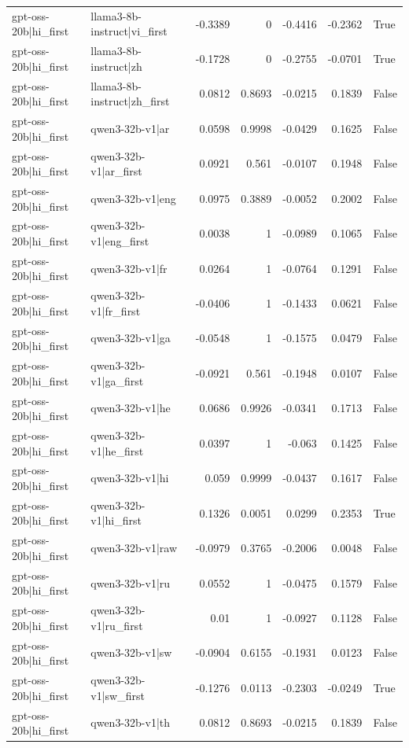 \begin{table}
\begin{tabular}{l l r r r r l}
gpt-oss-20b|hi_first & llama3-8b-instruct|vi_first & -0.3389 & 0 & -0.4416 & -0.2362 & True \\
gpt-oss-20b|hi_first & llama3-8b-instruct|zh & -0.1728 & 0 & -0.2755 & -0.0701 & True \\
gpt-oss-20b|hi_first & llama3-8b-instruct|zh_first & 0.0812 & 0.8693 & -0.0215 & 0.1839 & False \\
gpt-oss-20b|hi_first & qwen3-32b-v1|ar & 0.0598 & 0.9998 & -0.0429 & 0.1625 & False \\
gpt-oss-20b|hi_first & qwen3-32b-v1|ar_first & 0.0921 & 0.561 & -0.0107 & 0.1948 & False \\
gpt-oss-20b|hi_first & qwen3-32b-v1|eng & 0.0975 & 0.3889 & -0.0052 & 0.2002 & False \\
gpt-oss-20b|hi_first & qwen3-32b-v1|eng_first & 0.0038 & 1 & -0.0989 & 0.1065 & False \\
gpt-oss-20b|hi_first & qwen3-32b-v1|fr & 0.0264 & 1 & -0.0764 & 0.1291 & False \\
gpt-oss-20b|hi_first & qwen3-32b-v1|fr_first & -0.0406 & 1 & -0.1433 & 0.0621 & False \\
gpt-oss-20b|hi_first & qwen3-32b-v1|ga & -0.0548 & 1 & -0.1575 & 0.0479 & False \\
gpt-oss-20b|hi_first & qwen3-32b-v1|ga_first & -0.0921 & 0.561 & -0.1948 & 0.0107 & False \\
gpt-oss-20b|hi_first & qwen3-32b-v1|he & 0.0686 & 0.9926 & -0.0341 & 0.1713 & False \\
gpt-oss-20b|hi_first & qwen3-32b-v1|he_first & 0.0397 & 1 & -0.063 & 0.1425 & False \\
gpt-oss-20b|hi_first & qwen3-32b-v1|hi & 0.059 & 0.9999 & -0.0437 & 0.1617 & False \\
gpt-oss-20b|hi_first & qwen3-32b-v1|hi_first & 0.1326 & 0.0051 & 0.0299 & 0.2353 & True \\
gpt-oss-20b|hi_first & qwen3-32b-v1|raw & -0.0979 & 0.3765 & -0.2006 & 0.0048 & False \\
gpt-oss-20b|hi_first & qwen3-32b-v1|ru & 0.0552 & 1 & -0.0475 & 0.1579 & False \\
gpt-oss-20b|hi_first & qwen3-32b-v1|ru_first & 0.01 & 1 & -0.0927 & 0.1128 & False \\
gpt-oss-20b|hi_first & qwen3-32b-v1|sw & -0.0904 & 0.6155 & -0.1931 & 0.0123 & False \\
gpt-oss-20b|hi_first & qwen3-32b-v1|sw_first & -0.1276 & 0.0113 & -0.2303 & -0.0249 & True \\
gpt-oss-20b|hi_first & qwen3-32b-v1|th & 0.0812 & 0.8693 & -0.0215 & 0.1839 & False \\

\end{tabular}
\end{table}
